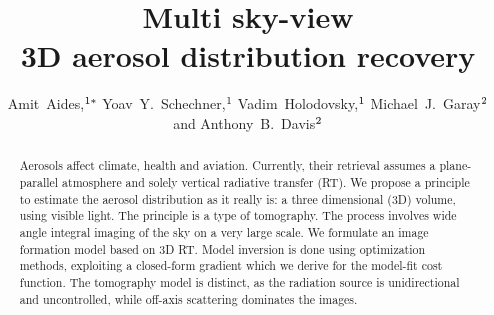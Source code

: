 \documentclass[10pt,letterpaper]{article}
\newcommand\authnote[1]{\textsuperscript{\normalfont#1}}
\newcommand\affilnote[1]{\textsuperscript{\normalfont#1}}
\providecommand\textsuperscript[1]{$^{#1}$}
\begin{document}


\title{Multi sky-view\\ 3D aerosol distribution recovery}

\author{Amit~Aides,\authnote{1*} Yoav~Y.~Schechner,\authnote{1}
  Vadim~Holodovsky,\authnote{1} Michael~J.~Garay\authnote{2} and Anthony~B.~Davis\authnote{2}}

\address{\affilnote{1}Electrical Engineering Department, Technion - Israel Institute of Technology, Haifa 32000, Israel\\
  \affilnote{2}Jet Propulsion Laboratory, California Institute of
  Technology, Pasadena, CA 91109, USA}

\email{\authnote{*}amitibo@tx.technion.ac.il} %




\begin{abstract}
  Aerosols affect climate, health and aviation.  Currently, their
  retrieval assumes a plane-parallel atmosphere and solely vertical
  radiative transfer (RT). We propose a principle to estimate the
  aerosol distribution as it really is: a three dimensional (3D)
  volume, using visible light.  The principle is a type of
  tomography. The process involves wide angle integral imaging of the
  sky on a very large scale.  We formulate an image formation model
  based on 3D RT. Model inversion is done using optimization methods,
  exploiting a closed-form gradient which we derive for the model-fit
  cost function.  The tomography model is distinct, as the radiation
  source is unidirectional and uncontrolled, while off-axis scattering
  dominates the images.
\end{abstract}

\end{document}
